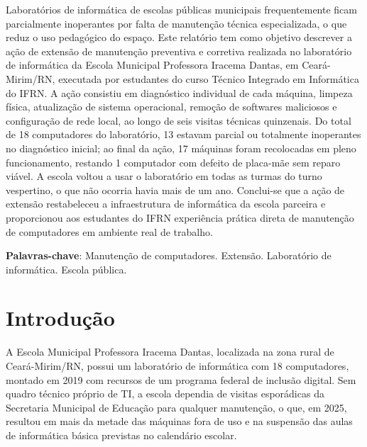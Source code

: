 \documentclass[article,12pt,a4paper]{abntex2}
\begin{document}
\maketitle

\begin{resumo}
Laboratórios de informática de escolas públicas municipais frequentemente
ficam parcialmente inoperantes por falta de manutenção técnica
especializada, o que reduz o uso pedagógico do espaço. Este relatório tem
como objetivo descrever a ação de extensão de manutenção preventiva e
corretiva realizada no laboratório de informática da Escola Municipal
Professora Iracema Dantas, em Ceará-Mirim/RN, executada por estudantes do
curso Técnico Integrado em Informática do IFRN. A ação consistiu em
diagnóstico individual de cada máquina, limpeza física, atualização de
sistema operacional, remoção de softwares maliciosos e configuração de
rede local, ao longo de seis visitas técnicas quinzenais. Do total de 18
computadores do laboratório, 13 estavam parcial ou totalmente inoperantes
no diagnóstico inicial; ao final da ação, 17 máquinas foram recolocadas em
pleno funcionamento, restando 1 computador com defeito de placa-mãe sem
reparo viável. A escola voltou a usar o laboratório em todas as turmas do
turno vespertino, o que não ocorria havia mais de um ano. Conclui-se que a
ação de extensão restabeleceu a infraestrutura de informática da escola
parceira e proporcionou aos estudantes do IFRN experiência prática direta
de manutenção de computadores em ambiente real de trabalho.

\vspace{\onelineskip}
\noindent
\textbf{Palavras-chave}: Manutenção de computadores. Extensão. Laboratório de informática. Escola pública.
\end{resumo}

\textual

\section{Introdução}

A Escola Municipal Professora Iracema Dantas, localizada na zona rural de
Ceará-Mirim/RN, possui um laboratório de informática com 18 computadores,
montado em 2019 com recursos de um programa federal de inclusão digital.
Sem quadro técnico próprio de TI, a escola dependia de visitas esporádicas
da Secretaria Municipal de Educação para qualquer manutenção, o que, em
2025, resultou em mais da metade das máquinas fora de uso e na suspensão
das aulas de informática básica previstas no calendário escolar.
\end{document}
